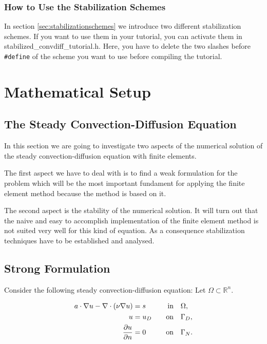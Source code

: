 \documentclass[a4paper, 11pt, twoside]{article}
\begin{document}
\subsubsection{How to Use the Stabilization Schemes}
In section \ref{sec:stabilizationschemes} we introduce two different stabilization schemes. If you want to use them in your tutorial, you can activate them in stabilized\_convdiff\_tutorial.h. Here, you have to delete the two slashes before \verb'#define' of the scheme you want to use before compiling the tutorial.

\section{Mathematical Setup}
\subsection{The Steady Convection-Diffusion Equation}\label{sectionequation}

In this section we are going to investigate two aspects of the numerical solution of the steady convection-diffusion equation with finite elements.

The first aspect we have to deal with is to find a weak formulation for the problem which will be the most important fundament for applying the finite element method because the method is based on it.

The second aspect is the stability of the numerical solution. It will turn out that the naive and easy to accomplish implementation of the finite element method is not suited very well for this kind of equation. As a consequence stabilization techniques have to be established and analysed.

\subsection{Strong Formulation}
Consider the following steady convection-diffusion equation: Let $\Omega \subset \mathbb{R}^{n}$.

	\begin{align}
		\label{eq:steady}a \cdot \nabla u - \nabla \cdot \left(\nu\nabla u\right) &= s \quad &\text{in} \quad &\Omega, \\
		\notag u &= u_{D} \quad &\text{on} \quad &\Gamma_D, \\
		\label{eq:neumann} \frac{\partial u}{\partial n} &= 0 \quad &\text{on} \quad &\Gamma_N.
	\end{align}
\end{document}
